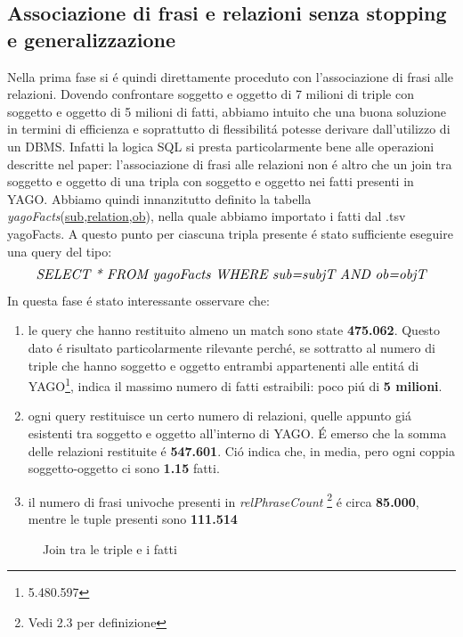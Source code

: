 \documentclass[twocolumn,10pt]{asme2ej}
\begin{document}
\subsection{Associazione di frasi e relazioni senza stopping e generalizzazione}

Nella prima fase si \'e quindi direttamente proceduto con l'associazione di frasi alle relazioni. Dovendo confrontare soggetto e oggetto di 7 milioni di triple con soggetto e oggetto di 5 milioni di fatti, abbiamo intuito che una  buona soluzione in termini di efficienza e soprattutto di flessibilit\'a  potesse derivare dall'utilizzo di un DBMS. Infatti la logica SQL si presta particolarmente bene alle operazioni descritte nel paper: l'associazione di frasi alle relazioni non \'e altro che un join tra soggetto  e oggetto di una tripla con soggetto e oggetto nei fatti presenti in YAGO. Abbiamo quindi innanzitutto definito la tabella \textit{yagoFacts}(\underline{sub},\underline{relation},\underline{ob}), nella quale abbiamo importato i fatti dal .tsv yagoFacts. A questo punto per ciascuna tripla presente \'e stato sufficiente eseguire una query del tipo: \\
\begin{equation}
\small{\small{\textit{SELECT * FROM yagoFacts WHERE sub=subjT AND ob=objT}}}
\end{equation}
In questa fase \'e stato interessante osservare che:

\begin{enumerate}
\item le query che hanno restituito almeno un match sono state \textbf{475.062}. Questo dato \'e risultato particolarmente  rilevante perch\'e, se sottratto al numero di triple che hanno soggetto e oggetto entrambi appartenenti alle entit\'a di YAGO\footnote{5.480.597}, indica il massimo numero di fatti estraibili: poco pi\'u di \textbf{5 milioni}.
\item ogni query restituisce un certo numero di relazioni, quelle appunto gi\'a esistenti tra soggetto e oggetto all'interno di YAGO. \'E emerso che la somma delle relazioni restituite \'e \textbf{547.601}. Ci\'o indica che, in media, pero ogni coppia soggetto-oggetto ci sono \textbf{1.15} fatti.
\item il numero di frasi univoche  presenti in \textit{relPhraseCount} \footnote{Vedi 2.3 per definizione} \'e circa \textbf{85.000}, mentre le tuple presenti sono \textbf{111.514}  
\end{enumerate}

\begin{figure} 
\centerline{}
\caption{Join tra le triple e i fatti}
\label{step1.ps}
\end{figure}
\end{document}
